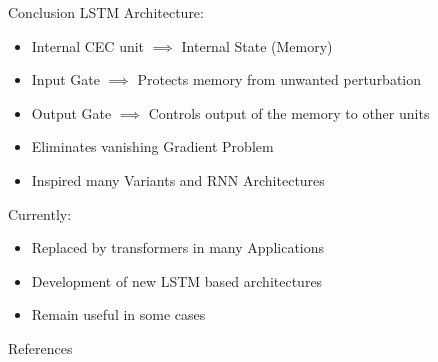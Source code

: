 \documentclass[10pt, aspectratio=169]{beamer}
\begin{document}
\begin{frame}[t]{Conclusion}
LSTM Architecture: \pause
\begin{itemize}
    \item Internal CEC unit \begin{math}\implies \end{math} Internal State (Memory) \pause
    \item Input Gate \begin{math}\implies\end{math} Protects memory from unwanted perturbation \pause
    \item Output Gate \begin{math}\implies\end{math} Controls output of the memory to other units \pause
    \item Eliminates vanishing Gradient Problem \pause
    \item Inspired many Variants and RNN Architectures \pause
\end{itemize}
Currently: \pause
\begin{itemize}
    \item Replaced by transformers in many Applications \pause
    \item Development of new LSTM based architectures \pause
    \item Remain useful in some cases 
\end{itemize}
\end{frame}

\nocite{alselwi2024lstmfuture}
\nocite{bolboaca2023lstmperformance}
\nocite{eck2002musicgeneration}
\nocite{gers1999forgetgate}
\nocite{gers2001timeseries}
\nocite{gokmen2018hadamard}
\nocite{gradient-clipping}
\nocite{harris1954languagestructure}
\nocite{hochreiter1997lstm}
\nocite{nielsen2024electricitypriceforcasting}
\nocite{torres2022elctricityforecasting}
\nocite{zhao2025lstmtransformerhybrid}
\nocite{zheng2018scalability}
\nocite{zheng2020scalability}
\nocite{hochreiter1991}
\nocite{elman90}
\nocite{werb1990bptt}
\nocite{pascanu2013rnntraining}
\nocite{vaswani2017attention}

\begin{frame}[allowframebreaks]{References}

  
  

\end{frame}
\end{document}
